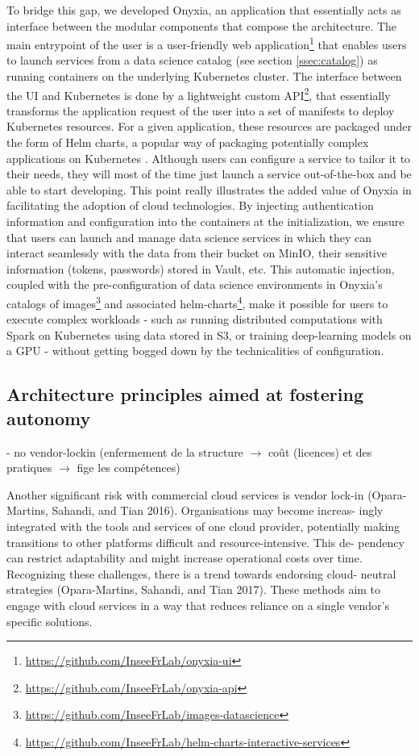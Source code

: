
To bridge this gap, we developed Onyxia, an application that essentially acts as interface between the modular components that compose the architecture. The main entrypoint of the user is a user-friendly web application\footnote{\url{https://github.com/InseeFrLab/onyxia-ui}} that enables users to launch services from a data science catalog (see section \ref{ssec:catalog}) as running containers on the underlying Kubernetes cluster. The interface between the UI and Kubernetes is done by a lightweight custom API\footnote{\url{https://github.com/InseeFrLab/onyxia-api}}, that essentially transforms the application request of the user into a set of manifests to deploy Kubernetes resources. For a given application, these resources are packaged under the form of Helm charts, a popular way of packaging potentially complex applications on Kubernetes \cite{gokhale2021creating}. Although users can configure a service to tailor it to their needs, they will most of the time just launch a service out-of-the-box and be able to start developing. This point really illustrates the added value of Onyxia in facilitating the adoption of cloud technologies. By injecting authentication information and configuration into the containers at the initialization, we ensure that users can launch and manage data science services in which they can interact seamlessly with the data from their bucket on MinIO, their sensitive information (tokens, passwords) stored in Vault, etc. This automatic injection, coupled with the pre-configuration of data science environments in Onyxia's catalogs of images\footnote{\url{https://github.com/InseeFrLab/images-datascience}} and associated helm-charts\footnote{\url{https://github.com/InseeFrLab/helm-charts-interactive-services}}, make it possible for users to execute complex workloads - such as running distributed computations with Spark on Kubernetes using data stored in S3, or training deep-learning models on a GPU - without getting bogged down by the technicalities of configuration.

\subsection{Architecture principles aimed at fostering autonomy}

- no vendor-lockin (enfermement de la structure $\rightarrow$ coût (licences) et des pratiques $\rightarrow$ fige les compétences)

Another significant risk with commercial cloud services is vendor lock-in
(Opara-Martins, Sahandi, and Tian 2016). Organisations may become increas-
ingly integrated with the tools and services of one cloud provider, potentially
making transitions to other platforms difficult and resource-intensive. This de-
pendency can restrict adaptability and might increase operational costs over
time. Recognizing these challenges, there is a trend towards endorsing cloud-
neutral strategies (Opara-Martins, Sahandi, and Tian 2017). These methods
aim to engage with cloud services in a way that reduces reliance on a single
vendor’s specific solutions.

